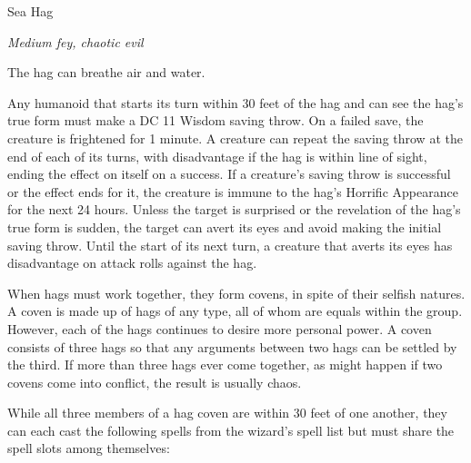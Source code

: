 \begin{monsterbox}{Sea Hag}
\begin{hangingpar}
\textit{Medium fey, chaotic evil}
\end{hangingpar}
\dndline%
\basics[%
armorclass = 14,
hitpoints = 7d8 + 21,
speed = {30 ft., swim 40 ft.}
]
\dndline%
\stats[%
STR = \stat{16},
DEX = \stat{13},
CON = \stat{16},
INT = \stat{12},
WIS = \stat{12},
CHA = \stat{13}
]
\dndline%
\details[%
skills={},
damageimmunities={},
savingthrows={},
conditionimmunities={},
damageresistances={},
damagevulnerabilities={},
senses={darkvision 60 ft., passive Perception 11},
languages={Aquan, Common, Giant},
challenge=2
]
\dndline%
\begin{monsteraction}[Amphibious]
The hag can breathe air and water.
\end{monsteraction}
\begin{monsteraction}
Any humanoid that starts its turn within 30 feet of the hag and can see the hag's true form must make a DC 11 Wisdom saving throw. On a failed save, the creature is frightened for 1 minute. A creature can repeat the saving throw at the end of each of its turns, with disadvantage if the hag is within line of sight, ending the effect on itself on a success. If a creature's saving throw is successful or the effect ends for it, the creature is immune to the hag's Horrific Appearance for the next 24 hours.
Unless the target is surprised or the revelation of the hag's true form is sudden, the target can avert its eyes and avoid making the initial saving throw. Until the start of its next turn, a creature that averts its eyes has disadvantage on attack rolls against the hag.
\end{monsteraction}
\begin{monsteraction}
When hags must work together, they form covens, in spite of their selfish natures. A coven is made up of hags of any type, all of whom are equals within the group. However, each of the hags continues to desire more personal power.
A coven consists of three hags so that any arguments between two hags can be settled by the third. If more than three hags ever come together, as might happen if two covens come into conflict, the result is usually chaos.
\end{monsteraction}
\begin{monsteraction}
While all three members of a hag coven are within 30 feet of one another, they can each cast the following spells from the wizard's spell list but must share the spell slots among themselves:


\end{monsteraction}
\end{monsterbox}

